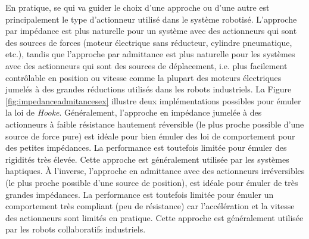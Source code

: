 En pratique, se qui va guider le choix d'une approche ou d'une autre est principalement le type d'actionneur utilisé dans le système robotisé. L'approche par impédance est plus naturelle pour un système avec des actionneurs qui sont des sources de forces (moteur électrique sans réducteur, cylindre pneumatique, etc.), tandis que l'approche par admittance est plus naturelle pour les systèmes avec des actionneurs qui sont des sources de déplacement, i.e. plus facilement contrôlable en position ou vitesse comme la plupart des moteurs électriques jumelés à des grandes réductions utilisés dans les robots industriels. La Figure \ref{fig:impedanceadmitancesex} illustre deux implémentations possibles pour émuler la loi de \textit{Hooke}.
%
Généralement, l'approche en impédance jumelée à des actionneurs à faible résistance hautement réversible (le plus proche possible d'une source de force pure) est idéale pour bien émuler des loi de comportement pour des petites impédances. La performance est toutefois limitée pour émuler des rigidités très élevée. Cette approche est généralement utilisée par les systèmes haptiques. À l'inverse, l'approche en admittance avec des actionneurs irréversibles (le plus proche possible d'une source de position), est idéale pour émuler de très grandes impédances. La performance est toutefois limitée pour émuler un comportement très compliant (peu de résistance) car l'accélération et la vitesse des actionneurs sont limités en pratique. Cette approche est généralement utilisée par les robots collaboratifs industriels. 
